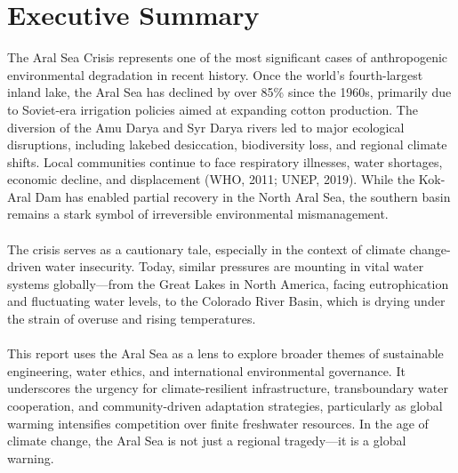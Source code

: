 \thispagestyle{plain}

\chapter*{Executive Summary}
The Aral Sea Crisis represents one of the most significant cases of anthropogenic environmental degradation in recent history.  Once the world’s fourth-largest inland lake, the Aral Sea has declined by over 85\% since the 1960s, primarily due to Soviet-era irrigation policies aimed at expanding cotton production. The diversion of the Amu Darya and Syr Darya rivers led to major ecological disruptions, including lakebed desiccation, biodiversity loss, and regional climate shifts. Local communities continue to face respiratory illnesses, water shortages, economic decline, and displacement (WHO, 2011; UNEP, 2019). While the Kok-Aral Dam has enabled partial recovery in the North Aral Sea, the southern basin remains a stark symbol of irreversible environmental mismanagement. \\
\\The crisis serves as a cautionary tale, especially in the context of climate change-driven water insecurity. Today, similar pressures are mounting in vital water systems globally—from the Great Lakes in North America, facing eutrophication and fluctuating water levels, to the Colorado River Basin, which is drying under the strain of overuse and rising temperatures. \\
\\This report uses the Aral Sea as a lens to explore broader themes of sustainable engineering, water ethics, and international environmental governance. It underscores the urgency for climate-resilient infrastructure, transboundary water cooperation, and community-driven adaptation strategies, particularly as global warming intensifies competition over finite freshwater resources. In the age of climate change, the Aral Sea is not just a regional tragedy—it is a global warning. 

